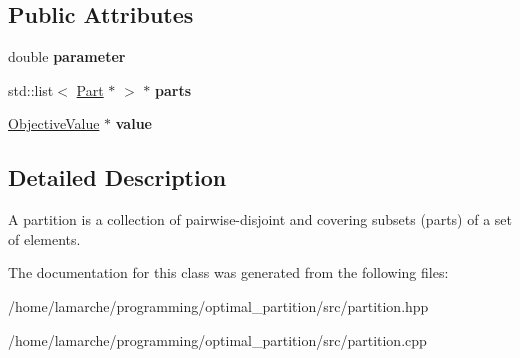 \subsection*{Public Attributes}
\begin{DoxyCompactItemize}
\item 
\hypertarget{classPartition_a1125b9b5548fa65e98a6dd94279c53bc}{double {\bfseries parameter}}\label{classPartition_a1125b9b5548fa65e98a6dd94279c53bc}

\item 
\hypertarget{classPartition_a887cae6498c54754779d7956b48e8d3e}{std\-::list$<$ \hyperlink{classPart}{Part} $\ast$ $>$ $\ast$ {\bfseries parts}}\label{classPartition_a887cae6498c54754779d7956b48e8d3e}

\item 
\hypertarget{classPartition_acb93c172b3e9a1bb4c6e0b1c5a50a13d}{\hyperlink{classObjectiveValue}{Objective\-Value} $\ast$ {\bfseries value}}\label{classPartition_acb93c172b3e9a1bb4c6e0b1c5a50a13d}

\end{DoxyCompactItemize}


\subsection{Detailed Description}
A partition is a collection of pairwise-\/disjoint and covering subsets (parts) of a set of elements. 

The documentation for this class was generated from the following files\-:\begin{DoxyCompactItemize}
\item 
/home/lamarche/programming/optimal\-\_\-partition/src/partition.\-hpp\item 
/home/lamarche/programming/optimal\-\_\-partition/src/partition.\-cpp\end{DoxyCompactItemize}
